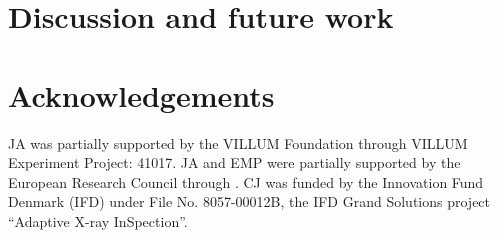 \section{Discussion and future work}
\label{sec:conclusion}


\section{Acknowledgements}

JA was partially supported by the VILLUM Foundation through
VILLUM Experiment Project: 41017.
JA and EMP were partially supported by the European Research Council
through .
CJ was funded by the Innovation Fund Denmark (IFD) under
File No. 8057-00012B, the IFD
Grand Solutions project ``Adaptive X-ray InSpection''.


